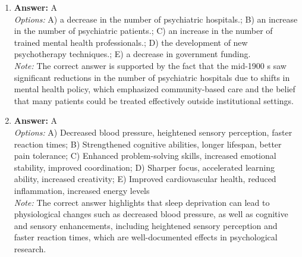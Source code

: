 \documentclass[12pt]{article}
\begin{document}
\begin{enumerate}[label=\arabic*.]
\item \textbf{Answer:} A
\\ \textit{Options:} A) a decrease in the number of psychiatric hospitals.; B) an increase in the number of psychiatric patients.; C) an increase in the number of trained mental health professionals.; D) the development of new psychotherapy techniques.; E) a decrease in government funding.
\\ \textit{Note:} The correct answer is supported by the fact that the mid-1900 s saw significant reductions in the number of psychiatric hospitals due to shifts in mental health policy, which emphasized community-based care and the belief that many patients could be treated effectively outside institutional settings.
\item \textbf{Answer:} A
\\ \textit{Options:} A) Decreased blood pressure, heightened sensory perception, faster reaction times; B) Strengthened cognitive abilities, longer lifespan, better pain tolerance; C) Enhanced problem-solving skills, increased emotional stability, improved coordination; D) Sharper focus, accelerated learning ability, increased creativity; E) Improved cardiovascular health, reduced inflammation, increased energy levels
\\ \textit{Note:} The correct answer highlights that sleep deprivation can lead to physiological changes such as decreased blood pressure, as well as cognitive and sensory enhancements, including heightened sensory perception and faster reaction times, which are well-documented effects in psychological research.
\end{enumerate}
\end{document}
